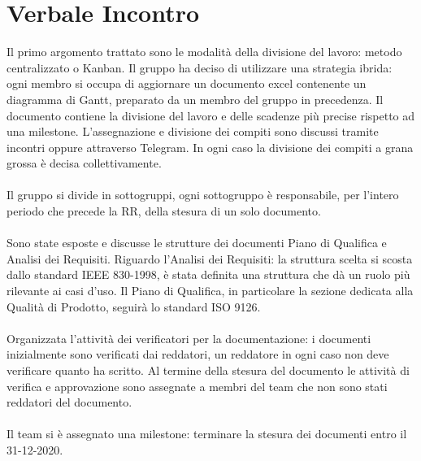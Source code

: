 \section{Verbale Incontro}
    Il primo argomento trattato sono le modalità della divisione del lavoro: metodo centralizzato o	Kanban. Il gruppo ha deciso di utilizzare una strategia ibrida:	ogni membro si occupa di aggiornare un documento excel contenente un diagramma di Gantt, preparato da un membro del gruppo in precedenza. Il documento contiene la divisione del lavoro e delle scadenze più precise rispetto ad una milestone. L'assegnazione e divisione dei compiti sono discussi tramite incontri oppure attraverso Telegram. In ogni caso la divisione dei compiti a grana grossa è decisa collettivamente.
    \\ \\
    \noindent Il gruppo si divide in sottogruppi, ogni sottogruppo è responsabile, per l'intero periodo che precede la RR, della stesura di un solo documento.
    \\ \\
    \noindent Sono state esposte e discusse le strutture dei documenti Piano di Qualifica e Analisi dei Requisiti. Riguardo l'Analisi dei Requisiti: la struttura scelta si scosta dallo standard IEEE 830-1998, è stata definita una struttura che dà un ruolo più rilevante ai casi d'uso. Il Piano di Qualifica, in particolare la sezione dedicata alla Qualità di Prodotto, seguirà lo standard ISO 9126. 
    \\ \\
    \noindent Organizzata l'attività dei verificatori per la documentazione: i documenti inizialmente sono verificati dai reddatori, un reddatore in ogni caso non deve verificare quanto ha scritto. Al termine della stesura del documento le attività di verifica e approvazione sono assegnate a membri del team che non sono stati reddatori del documento.
    \\ \\
    \noindent Il team si è assegnato una milestone: terminare la stesura dei documenti entro il 31-12-2020.
